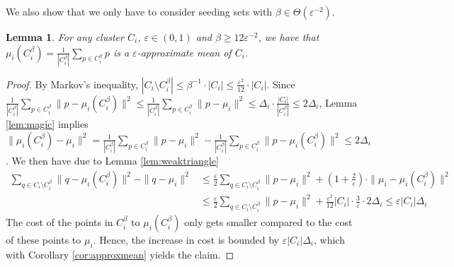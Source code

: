 \documentclass[10pt,a4paper]{amsart}
\newtheorem{lemma}[theorem]{Lemma}
\begin{document}
We also show that we only have to consider seeding sets with $ \beta \in \Theta(\varepsilon^{-2})$.
\begin{lemma}
\label{lem:magiccore}
For any cluster $C_i$, $\varepsilon\in (0,1)$ and $\beta\geq 12\varepsilon^{-2}$, we have that $\mu_i(C_i^{\beta}) = \frac{1}{|C_i^{\beta}|} \sum_{p\in C_i^{\beta}}p$ is a $\varepsilon$-approximate mean of $C_i$.
\end{lemma}
\begin{proof}
By Markov's inequality, $|C_i\setminus C_i^{\beta}|\leq \beta^{-1} \cdot|C_i|\leq \frac{\varepsilon^2}{12}\cdot |C_i|$.
Since $\frac{1}{|C_i^{\beta}|}\sum_{p\in C_i^{\beta}}\|p-\mu_i(C_i^{\beta})\|^2 \leq \frac{1}{|C_i^{\beta}|}\sum_{p\in C_i^{\beta}}\|p-\mu_i\|^2 \leq \Delta_i\cdot \frac{|C_i|}{|C_i^{\beta}|}\leq 2\Delta_i$, Lemma \ref{lem:magic} implies $\|\mu_i(C_i^{\beta})-\mu_i\|^2 = \frac{1}{|C_i^{\beta}|}\sum_{p\in C_i^{\beta}}\|p-\mu_i\|^2 - \frac{1}{|C_i^{\beta}|}\sum_{p\in C_i^{\beta}}\|p-\mu_i(C_i^\beta)\|^2 \leq 2\Delta_i$.
We then have due to Lemma \ref{lem:weaktriangle}
\begin{align*}
\sum_{q\in C_i\setminus C_i^{\beta}} \|q-\mu_i(C_i^{\beta})\|^2 - \|q-\mu_i\|^2 & \leq \frac{\varepsilon}{2} \sum_{q\in C_i\setminus C_i^{\beta}} \|p-\mu_i\|^2 + \left(1+\frac{2}{\varepsilon} \right)\cdot  \|\mu_i - \mu_i(C_i^\beta)\|^2 \\
&\leq \frac{\varepsilon}{2} \sum_{q\in C_i\setminus C_i^{\beta}} \|p-\mu_i\|^2 + \frac{\varepsilon^2}{12} |C_i|\cdot \frac{3}{\varepsilon} \cdot 2\Delta_i \leq \varepsilon |C_i|\Delta_i
\end{align*}
The cost of the points in $C_i^\beta$ to $\mu_i(C_i^\beta)$ only gets smaller compared to the cost of these points to $\mu_i$. Hence, the increase in cost is bounded by $\varepsilon |C_i|\Delta_i$, which with Corollary \ref{cor:approxmean} yields the claim.
\end{proof}
\end{document}
